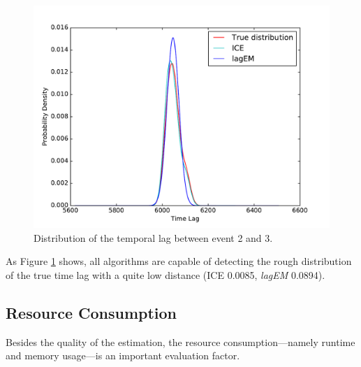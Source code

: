 \documentclass[conference]{IEEEtran}
\theoremstyle{examplestyle}
\begin{document}
\begin{figure}[!htb]
	\centering
	\includegraphics[scale=0.4]{images/symantec/2-3.pdf}
	\caption{Distribution of the temporal lag between event 2 and 3.}
	\label{fig:2-3}
\end{figure}

As Figure \ref{fig:2-3} shows, all algorithms are capable of detecting the rough distribution of the true time lag with a quite low distance (\ac{ICE} 0.0085, \textit{lagEM} 0.0894).




\subsection{Resource Consumption}
Besides the quality of the estimation, the resource consumption---namely runtime and memory usage---is an important evaluation factor. 
\end{document}
